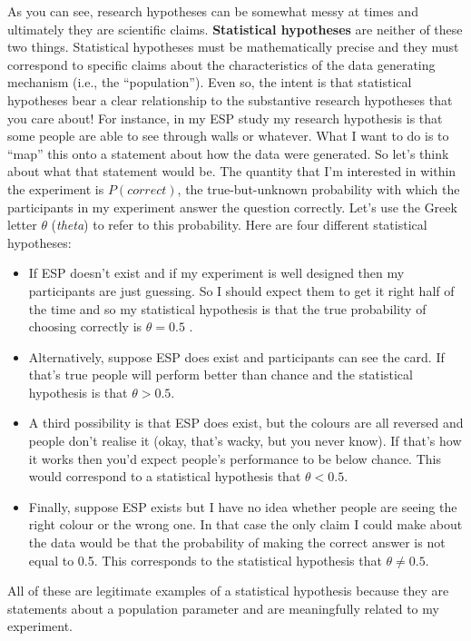 \documentclass[
  a4paper,
]{book}
\providecommand{\tightlist}{%
  \setlength{\itemsep}{0pt}\setlength{\parskip}{0pt}}
\begin{document}
As you can see, research hypotheses can be somewhat messy at times and
ultimately they are scientific claims. \textbf{Statistical hypotheses}
are neither of these two things. Statistical hypotheses must be
mathematically precise and they must correspond to specific claims about
the characteristics of the data generating mechanism (i.e., the
``population''). Even so, the intent is that statistical hypotheses bear
a clear relationship to the substantive research hypotheses that you
care about! For instance, in my ESP study my research hypothesis is that
some people are able to see through walls or whatever. What I want to do
is to ``map'' this onto a statement about how the data were generated.
So let's think about what that statement would be. The quantity that I'm
interested in within the experiment is \(P(correct)\), the
true-but-unknown probability with which the participants in my
experiment answer the question correctly. Let's use the Greek letter
\(\theta\) (\emph{theta}) to refer to this probability. Here are four
different statistical hypotheses:

\begin{itemize}
\tightlist
\item
  If ESP doesn't exist and if my experiment is well designed then my
  participants are just guessing. So I should expect them to get it
  right half of the time and so my statistical hypothesis is that the
  true probability of choosing correctly is \(\theta=0.5\) .
\item
  Alternatively, suppose ESP does exist and participants can see the
  card. If that's true people will perform better than chance and the
  statistical hypothesis is that \(\theta > 0.5\).
\item
  A third possibility is that ESP does exist, but the colours are all
  reversed and people don't realise it (okay, that's wacky, but you
  never know). If that's how it works then you'd expect people's
  performance to be below chance. This would correspond to a statistical
  hypothesis that \(\theta < 0.5\).
\item
  Finally, suppose ESP exists but I have no idea whether people are
  seeing the right colour or the wrong one. In that case the only claim
  I could make about the data would be that the probability of making
  the correct answer is not equal to 0.5. This corresponds to the
  statistical hypothesis that \(\theta \neq 0.5\).
\end{itemize}

All of these are legitimate examples of a statistical hypothesis because
they are statements about a population parameter and are meaningfully
related to my experiment.
\end{document}
